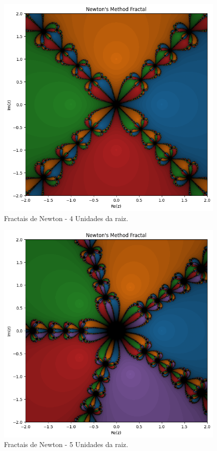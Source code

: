 \begin{figure}[H]
    \centering 
    \includegraphics[width=1\textwidth]{Imagens/nr2d_fractals/unit_roots/unitroot4.png}
    \caption{Fractais de Newton - 4 Unidades da raiz.}
    \label{fig:fractaisnr_unitroots4}
\end{figure}


\begin{figure}[H]
    \centering 
    \includegraphics[width=1\textwidth]{Imagens/nr2d_fractals/unit_roots/unitroot5.png}
    \caption{Fractais de Newton - 5 Unidades da raiz.}
    \label{fig:fractaisnr_unitroots5}
\end{figure}



